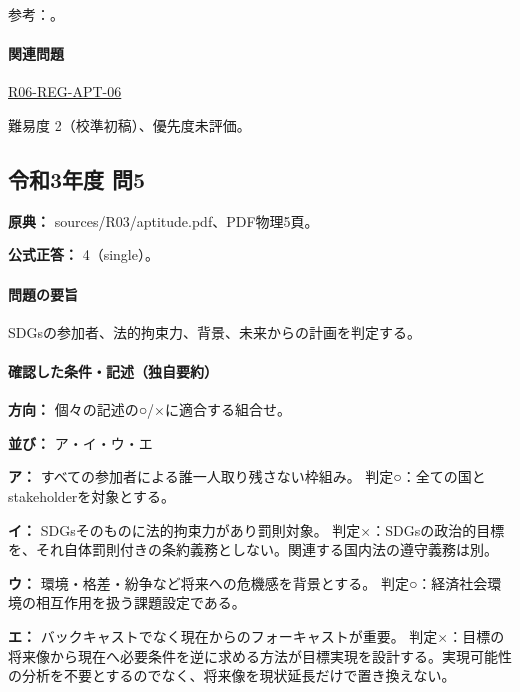 \par 参考：\cite{env_sdgs2016}。

\paragraph{関連問題} \hyperref[q:r06-reg-apt-06]{R06-REG-APT-06}

\par 難易度 2（校準初稿）、優先度未評価。

\subsection{令和3年度 問5}
\label{q:r03-reg-apt-05}

\noindent\textbf{原典：} sources/R03/aptitude.pdf、PDF物理5頁。

\textbf{公式正答：} 4（single）。

\paragraph{問題の要旨} SDGsの参加者、法的拘束力、背景、未来からの計画を判定する。

\paragraph{確認した条件・記述（独自要約）}\mbox{}\par

\noindent\textbf{方向：} 個々の記述の○/×に適合する組合せ。\par

\noindent\textbf{並び：} ア・イ・ウ・エ\par

\noindent\textbf{ア：} すべての参加者による誰一人取り残さない枠組み。 判定○：全ての国とstakeholderを対象とする。\par

\noindent\textbf{イ：} SDGsそのものに法的拘束力があり罰則対象。 判定×：SDGsの政治的目標を、それ自体罰則付きの条約義務としない。関連する国内法の遵守義務は別。\par

\noindent\textbf{ウ：} 環境・格差・紛争など将来への危機感を背景とする。 判定○：経済社会環境の相互作用を扱う課題設定である。\par

\noindent\textbf{エ：} バックキャストでなく現在からのフォーキャストが重要。 判定×：目標の将来像から現在へ必要条件を逆に求める方法が目標実現を設計する。実現可能性の分析を不要とするのでなく、将来像を現状延長だけで置き換えない。\par

